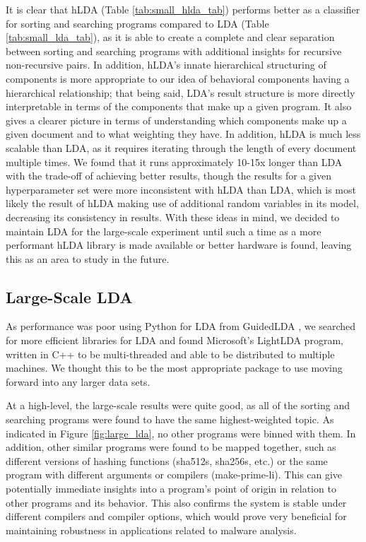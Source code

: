 It is clear that hLDA (Table \ref{tab:small_hlda_tab}) performs better as a classifier for sorting and searching programs compared to LDA (Table \ref{tab:small_lda_tab}), as it is able to create a complete and clear separation between sorting and searching programs with additional insights for recursive non-recursive pairs. In addition, hLDA's innate hierarchical structuring of components is more appropriate to our idea of behavioral components having a hierarchical relationship; that being said, LDA's result structure is more directly interpretable in terms of the components that make up a given program. It also gives a clearer picture in terms of understanding which components make up a given document and to what weighting they have. In addition, hLDA is much less scalable than LDA, as it requires iterating through the length of every document multiple times. We found that it runs approximately 10-15x longer than LDA with the trade-off of achieving better results, though the results for a given hyperparameter set were more inconsistent with hLDA than LDA, which is most likely the result of hLDA making use of additional random variables in its model, decreasing its consistency in results. With these ideas in mind, we decided to maintain LDA for the large-scale experiment until such a time as a more performant hLDA library is made available or better hardware is found, leaving this as an area to study in the future.

\subsection{Large-Scale LDA}
As performance was poor using Python for LDA from GuidedLDA \cite{guidedlda}, we searched for more efficient libraries for LDA and found Microsoft's LightLDA program, written in C++ to be multi-threaded and able to be distributed to multiple machines. We thought this to be the most appropriate package to use moving forward into any larger data sets.

At a high-level, the large-scale results were quite good, as all of the sorting and searching programs were found to have the same highest-weighted topic. As indicated in Figure \ref{fig:large_lda}, no other programs were binned with them. In addition, other similar programs were found to be mapped together, such as different versions of hashing functions (sha512s, sha256s, etc.) or the same program with different arguments or compilers (make-prime-li). This can give potentially immediate insights into a program's point of origin in relation to other programs and its behavior. This also confirms the system is stable under different compilers and compiler options, which would prove very beneficial for maintaining robustness in applications related to malware analysis.

